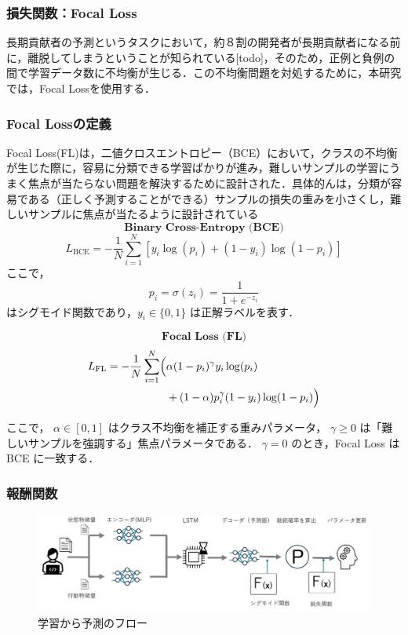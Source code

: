 \documentclass[submit,techrep,noauthor]{ipsj}
\begin{document}
\subsubsection{損失関数：Focal Loss}
長期貢献者の予測というタスクにおいて，約８割の開発者が長期貢献者になる前に，離脱してしまうということが知られている[todo]，そのため，正例と負例の間で学習データ数に不均衡が生じる．この不均衡問題を対処するために，本研究では，Focal Lossを使用する．
\subsubsection{Focal Lossの定義}
Focal Loss(FL)は，二値クロスエントロピー（BCE）において，クラスの不均衡が生じた際に，容易に分類できる学習ばかりが進み，難しいサンプルの学習にうまく焦点が当たらない問題を解決するために設計された．具体的んは，分類が容易である（正しく予測することができる）サンプルの損失の重みを小さくし，難しいサンプルに焦点が当たるように設計されている
\[\textbf{Binary Cross-Entropy (BCE)}\]
\[
L_{\mathrm{BCE}} = - \frac{1}{N} \sum_{i=1}^{N} \left[ y_i\log(p_i) + (1 - y_i)\log(1 - p_i)\right]
\]
ここで，
\[p_i = \sigma(z_i) = \frac{1}{1 + e^{-z_i}}\]はシグモイド関数であり，\(y_i \in \{0,1\}\) は正解ラベルを表す．


\[\textbf{Focal Loss (FL)}\]
\begin{align}
L_{\mathrm{FL}} = - \frac{1}{N} \sum_{i=1}^{N} \Bigl( & \alpha (1 - p_i)^{\gamma} y_i \log(p_i) \nonumber \\
& + (1 - \alpha) p_i^{\gamma} (1 - y_i) \log(1 - p_i) \Bigr) \nonumber 
\end{align}


ここで，
\(\alpha \in [0,1]\) はクラス不均衡を補正する重みパラメータ，  
\(\gamma \ge 0\) は「難しいサンプルを強調する」焦点パラメータである．  
\(\gamma = 0\) のとき，Focal Loss は BCE に一致する．


\subsubsection{報酬関数}
\begin{figure}[t]
    \centering
    \includegraphics[width = 1.0\textwidth]{./Hashimoto_fig/prediction.pdf}
    \caption{学習から予測のフロー}
    \label{fig:RL}
\end{figure}
\end{document}
